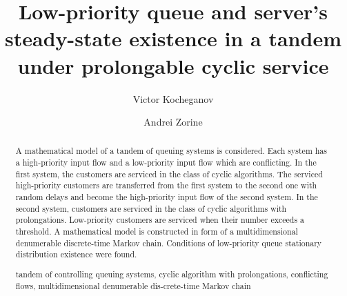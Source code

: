 \documentclass[runningheads,a4paper]{llncs}
\newcommand{\keywords}[1]{\par\addvspace\baselineskip
\noindent\keywordname\enspace\ignorespaces#1}
\begin{document}
\mainmatter  %

\title{Low-priority queue and server's steady-state existence in a tandem under prolongable cyclic service}


%
%
\author{Victor Kocheganov \and Andrei Zorine}
%


%
%

\maketitle


\begin{abstract}
A mathematical model of a tandem of queuing systems is considered. Each system has a high-priority input flow and a low-priority input flow which are conflicting. In the first system, the customers are serviced in the class of cyclic algorithms. The serviced high-priority customers are transferred from the first system to the second one  with random delays and become the high-priority input flow of the second system. In the second system, customers are serviced in the class of cyclic algorithms with prolongations. Low-priority customers are serviced when their number exceeds a threshold. A mathematical model is constructed in form of a multidimensional denumerable discrete-time Markov chain. Conditions of low-priority queue stationary distribution existence were found.
\keywords{tandem of controlling queuing systems, cyclic algorithm with prolongations, conflicting flows, multidimensional denumerable dis-crete-time Markov chain}
\end{abstract}
\end{document}
